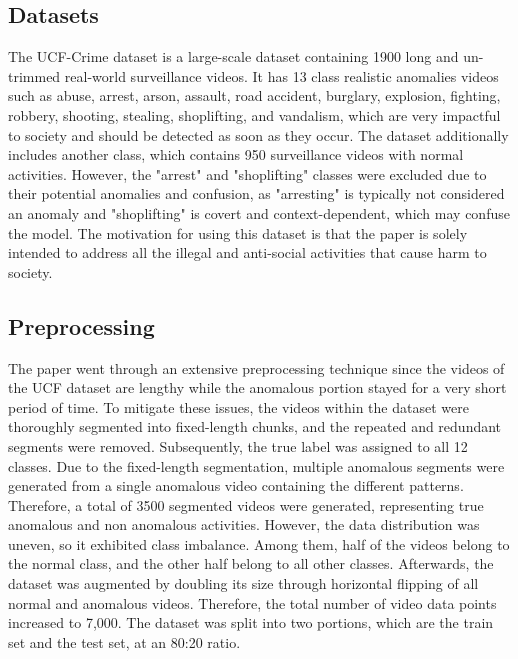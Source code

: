 \documentclass[runningheads]{llncs}
\begin{document}
\subsection{Datasets}
The UCF-Crime dataset is a large-scale dataset containing 1900 long and un-trimmed real-world surveillance videos. It has 13 class realistic anomalies videos such as abuse, arrest, arson, assault, road accident, burglary, explosion, fighting, robbery, shooting, stealing, shoplifting, and vandalism, which are very impactful to society and should be detected as soon as they occur. The dataset additionally includes another class, which contains 950 surveillance videos with normal activities. However, the "arrest" and "shoplifting" classes were excluded due to their potential anomalies and confusion, as "arresting" is typically not considered an anomaly and "shoplifting" is covert and context-dependent, which may confuse the model. The motivation for using this dataset is that the paper is solely intended to address all the illegal and anti-social activities that cause harm to society.

\subsection{Preprocessing}
The paper went through an extensive preprocessing technique since the videos of the UCF dataset are lengthy while the anomalous portion stayed for a very short period of time. To mitigate these issues, the videos within the dataset were thoroughly segmented into fixed-length chunks, and the repeated and redundant segments were removed. Subsequently, the true label was assigned to all 12 classes. Due to the fixed-length segmentation, multiple anomalous segments were generated from a single anomalous video containing the different patterns. Therefore, a total of 3500 segmented videos were generated, representing true anomalous  and non anomalous activities. However, the data distribution was uneven, so it exhibited class imbalance. Among them, half of the videos belong to the normal class, and the other half belong to all other classes. Afterwards, the dataset was augmented by doubling its size through horizontal flipping of all normal and anomalous videos. Therefore, the total number of video data points increased to 7,000. The dataset was split into two portions, which are the train set and the test set, at an 80:20 ratio.
\end{document}

